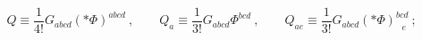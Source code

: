 \begin{equation}
Q \equiv \frac{1}{4!} G_{abcd} (*\Phi)^{abcd}\ , \qquad
Q_a \equiv \frac{1}{3!} G_{abcd} \Phi^{bcd} \ , \qquad
Q_{ae} \equiv \frac{1}{3!} G_{abcd} (*\Phi)^{bcd}_{~~~e}\ ; 
\end{equation}

